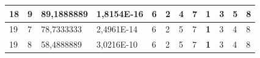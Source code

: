 \documentclass[conference]{IEEEtran}
\begin{document}
\begin{table}[]
\begin{tabular}{|llll|llllllll|}
\multicolumn{1}{|l|}{18}                                                    & \multicolumn{1}{l|}{9}                                                        & \multicolumn{1}{l|}{89,1888889}                                                   & 1,8154E-16                     & \multicolumn{1}{l|}{6}                                                  & \multicolumn{1}{l|}{2}                                                  & \multicolumn{1}{l|}{4}                                                  & \multicolumn{1}{l|}{7}                                                  & \multicolumn{1}{l|}{\textbf{1}}                                         & \multicolumn{1}{l|}{3}                                                  & \multicolumn{1}{l|}{5}                                                  & 8                          \\ \hline
\multicolumn{1}{|l|}{19}                                                    & \multicolumn{1}{l|}{7}                                                        & \multicolumn{1}{l|}{78,7333333}                                                   & 2,4961E-14                     & \multicolumn{1}{l|}{6}                                                  & \multicolumn{1}{l|}{2}                                                  & \multicolumn{1}{l|}{5}                                                  & \multicolumn{1}{l|}{7}                                                  & \multicolumn{1}{l|}{\textbf{1}}                                         & \multicolumn{1}{l|}{3}                                                  & \multicolumn{1}{l|}{4}                                                  & 8                          \\ \hline
\multicolumn{1}{|l|}{19}                                                    & \multicolumn{1}{l|}{8}                                                        & \multicolumn{1}{l|}{58,4888889}                                                   & 3,0216E-10                     & \multicolumn{1}{l|}{6}                                                  & \multicolumn{1}{l|}{2}                                                  & \multicolumn{1}{l|}{5}                                                  & \multicolumn{1}{l|}{7}                                                  & \multicolumn{1}{l|}{\textbf{1}}                                         & \multicolumn{1}{l|}{3}                                                  & \multicolumn{1}{l|}{4}                                                  & 8                          \\ \hline

\end{tabular}
\end{table}
\end{document}
